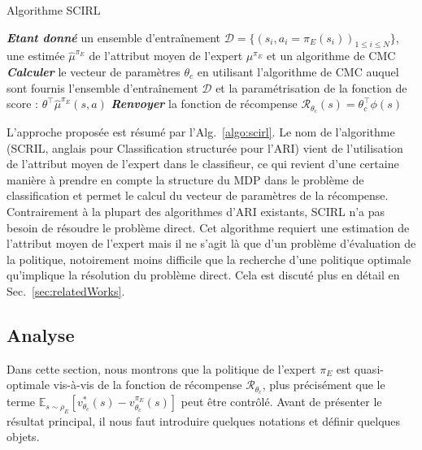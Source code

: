 \documentclass[english,utf8]{./hermes-journal}
\newcommand{\R}{\mathcal{R}}
\newcommand{\D}{\mathcal{D}}
\newcommand{\E}{\mathbb{E}}
\begin{document}
\begin{algorithm2e}%
  \SetAlgoVlined
  \caption{Algorithme SCIRL}
  \label{algo:scirl}
  \BlankLine
  \emph{\textbf{Etant donné}} un ensemble d'entraînement $\D = \{(s_i,a_i=\pi_E(s_i))_{1\leq i\leq N}\}$,
  une estimée $\hat{\mu}^{\pi_E}$ de l'attribut moyen de l'expert $\mu^{\pi_E}$ et un algorithme de CMC\;
  \BlankLine
  \emph{\textbf{Calculer}} le vecteur de paramètres $\theta_c$ en utilisant l'algorithme de CMC auquel sont fournis l'ensemble d'entraînement $\D$ et la paramétrisation de la fonction de score : $\theta^\top\hat{\mu}^{\pi_E}(s,a)$\;
  \BlankLine
  \emph{\textbf{Renvoyer}} la fonction de récompense $\R_{\theta_c}(s) = \theta_c^\top\phi(s)$ \;
\end{algorithm2e}

L'approche proposée est résumé par l'Alg.~\ref{algo:scirl}. Le nom de l'algorithme (SCRIL, anglais pour Classification structurée pour l'ARI) vient de l'utilisation de l'attribut moyen de l'expert dans le classifieur, ce qui revient d'une certaine manière à prendre en compte la structure du MDP dans le problème de classification et permet le calcul du vecteur de paramètres de la récompense. Contrairement à la plupart des algorithmes d'ARI existants, SCIRL n'a pas besoin de résoudre le problème direct. Cet algorithme requiert une estimation de l'attribut moyen de l'expert mais il ne s'agit là que d'un problème d'évaluation de la politique, notoirement moins difficile que la recherche d'une politique optimale qu'implique la résolution du problème direct. Cela est discuté plus en détail en Sec.~\ref{sec:relatedWorks}.
%


\subsection{Analyse}
\label{subsec:scirl:analysis}

Dans cette section, nous montrons que la politique de l'expert $\pi_E$ est quasi-optimale vis-à-vis de la fonction de récompense $\R_{\theta_c}$, plus précisément que le terme
$\E_{s\sim\rho_E}[v^*_{\theta_c}(s)-v^{\pi_E}_{\theta_c}(s)]$ peut être contrôlé.
Avant de présenter le résultat principal, il nous faut introduire quelques notations et définir quelques objets.
\end{document}
